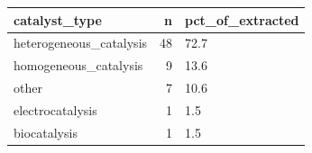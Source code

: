 \begin{tabular}{lrl}
\toprule
catalyst\_type & n & pct\_of\_extracted \\
\midrule
heterogeneous\_catalysis & 48 & 72.7 \\
homogeneous\_catalysis & 9 & 13.6 \\
other & 7 & 10.6 \\
electrocatalysis & 1 & 1.5 \\
biocatalysis & 1 & 1.5 \\
\bottomrule
\end{tabular}
